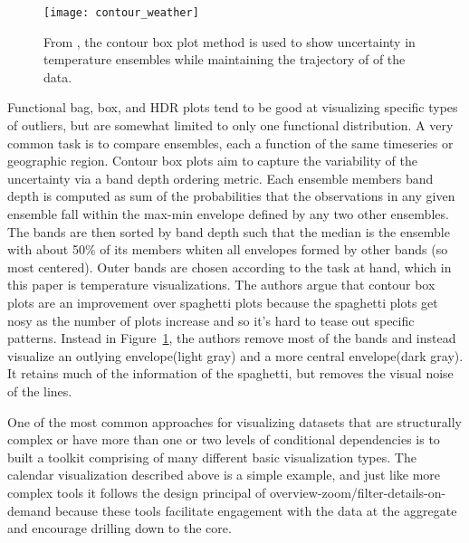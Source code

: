 \documentclass[../main.tex]{subfiles}
\begin{document}
\begin{figure}
  \texttt{[image: contour\_weather]}
  \caption{From \cite{whitaker_contour_2013}, the contour box plot method is used to show uncertainty in temperature ensembles while maintaining the trajectory of of the data.}
  \label{fig:countour}
\end{figure}
Functional bag, box, and HDR plots \cite{rob_j._hyndman_rainbow_2010, sun_functional_2011} tend to be good at visualizing specific types of outliers, but are somewhat limited to only one functional distribution. A very common task is to compare ensembles, each a function of the same timeseries or geographic region. Contour box plots\cite{whitaker_contour_2013} aim to capture the variability of the
uncertainty via a band depth ordering metric. Each ensemble members band depth
is computed as sum of the probabilities that the observations in any given
ensemble fall within the max-min envelope defined by any two other
ensembles. The bands are then sorted by band depth such that the median is the
ensemble with about 50\% of its members whiten all envelopes formed by other
bands (so most centered). Outer bands are chosen according to the task at
hand, which in this paper is temperature visualizations. The authors argue that contour box plots are an improvement over spaghetti plots \cite{luo_visualizing_2003} because the spaghetti plots get nosy as the number of plots increase and so it's hard to tease out specific patterns. Instead in
Figure~\ref{fig:countour}, the authors remove most of the bands and instead visualize an outlying envelope(light gray) and a more central envelope(dark gray). It retains much of the information of
the spaghetti, but removes the visual noise of the lines.

One of the most common approaches for visualizing datasets that are structurally complex or have more than one or two levels of conditional dependencies is to built a toolkit comprising of many different basic visualization types. The calendar visualization described above is a simple example, and just like more complex tools it follows the design principal of overview-zoom/filter-details-on-demand \cite{shneiderman_eyes_1996} because these tools facilitate engagement with the data at the aggregate and encourage drilling down to the core. 
\end{document}
